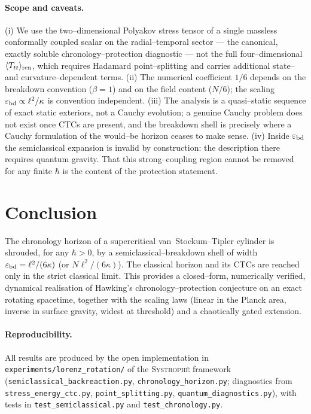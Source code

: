 \documentclass[11pt]{article}
\newcommand{\Ttt}{\langle T_{tt}\rangle}
\newcommand{\ebd}{\varepsilon_{\rm bd}}
\begin{document}
\paragraph{Scope and caveats.}
(i) We use the two--dimensional Polyakov stress tensor of a single massless conformally coupled
scalar on the radial--temporal sector --- the canonical, exactly soluble chronology--protection
diagnostic --- not the full four--dimensional $\Ttt_{\rm ren}$, which requires Hadamard
point--splitting and carries additional state-- and curvature--dependent terms. (ii) The numerical
coefficient $1/6$ depends on the breakdown convention ($\beta=1$) and on the field content
($N/6$); the scaling $\ebd\propto\ell^{2}/\kappa$ is convention independent. (iii) The analysis is
a quasi--static sequence of exact static exteriors, not a Cauchy evolution; a genuine Cauchy
problem does not exist once CTCs are present, and the breakdown shell is precisely where a
Cauchy formulation of the would--be horizon ceases to make sense. (iv) Inside $\ebd$ the
semiclassical expansion is invalid by construction: the description there requires quantum
gravity. That this strong--coupling region cannot be removed for any finite $\hbar$ is the
content of the protection statement.

\section{Conclusion}
The chronology horizon of a supercritical van~Stockum--Tipler cylinder is shrouded, for any
$\hbar>0$, by a semiclassical--breakdown shell of width $\ebd=\ell^{2}/(6\kappa)$ (or
$N\ell^{2}/(6\kappa)$). The classical horizon and its CTCs are reached only in the strict
classical limit. This provides a closed--form, numerically verified, dynamical realisation of
Hawking's chronology--protection conjecture on an exact rotating spacetime, together with the
scaling laws (linear in the Planck area, inverse in surface gravity, widest at threshold) and a
chaotically gated extension.

\paragraph{Reproducibility.}
All results are produced by the open implementation in \texttt{experiments/lorenz\_rotation/}
of the \textsc{Systroph\=e} framework (\texttt{semiclassical\_backreaction.py},
\texttt{chronology\_horizon.py}; diagnostics from \texttt{stress\_energy\_ctc.py},
\texttt{point\_splitting.py}, \texttt{quantum\_diagnostics.py}), with tests in
\texttt{test\_semiclassical.py} and \texttt{test\_chronology.py}.
\end{document}
